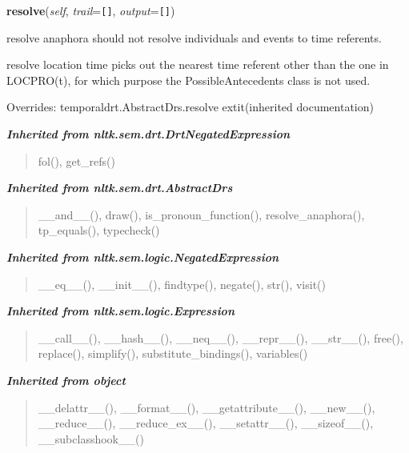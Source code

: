\hspace{.8\funcindent}\begin{boxedminipage}{\funcwidth}

    \raggedright \textbf{resolve}(\textit{self}, \textit{trail}={\tt \texttt{[}\texttt{]}}, \textit{output}={\tt \texttt{[}\texttt{]}})

\setlength{\parskip}{2ex}
    resolve anaphora should not resolve individuals and events to time 
    referents.

    resolve location time picks out the nearest time referent other than 
    the one in LOCPRO(t), for which purpose the PossibleAntecedents class 
    is not used.

\setlength{\parskip}{1ex}
      Overrides: temporaldrt.AbstractDrs.resolve 	extit{(inherited documentation)}

    \end{boxedminipage}


\large{\textbf{\textit{Inherited from nltk.sem.drt.DrtNegatedExpression}}}

\begin{quote}
fol(), get\_refs()
\end{quote}

\large{\textbf{\textit{Inherited from nltk.sem.drt.AbstractDrs}}}

\begin{quote}
\_\_and\_\_(), draw(), is\_pronoun\_function(), resolve\_anaphora(), tp\_equals(), typecheck()
\end{quote}

\large{\textbf{\textit{Inherited from nltk.sem.logic.NegatedExpression}}}

\begin{quote}
\_\_eq\_\_(), \_\_init\_\_(), findtype(), negate(), str(), visit()
\end{quote}

\large{\textbf{\textit{Inherited from nltk.sem.logic.Expression}}}

\begin{quote}
\_\_call\_\_(), \_\_hash\_\_(), \_\_neq\_\_(), \_\_repr\_\_(), \_\_str\_\_(), free(), replace(), simplify(), substitute\_bindings(), variables()
\end{quote}

\large{\textbf{\textit{Inherited from object}}}

\begin{quote}
\_\_delattr\_\_(), \_\_format\_\_(), \_\_getattribute\_\_(), \_\_new\_\_(), \_\_reduce\_\_(), \_\_reduce\_ex\_\_(), \_\_setattr\_\_(), \_\_sizeof\_\_(), \_\_subclasshook\_\_()
\end{quote}

